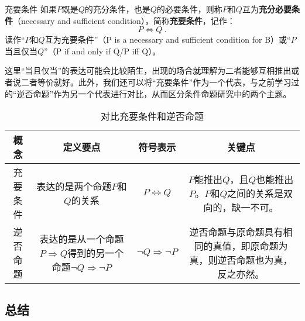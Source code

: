 \begin{definition}{充要条件}
如果$P$既是$Q$的充分条件，也是$Q$的必要条件，则称$P$和$Q$互为\textbf{充分必要条件}（necessary and sufficient condition），简称\textbf{充要条件}，记作：
\begin{equation}
P\Leftrightarrow Q~.
\end{equation}
读作“$P$和$Q$互为充要条件”（P is a necessary and sufficient condition for B）或“$P$当且仅当$Q$”（P if and only if Q/P iff Q）。
\end{definition}

这里“当且仅当”的表达可能会比较陌生，出现的场合就理解为二者能够互相推出或者说二者等价就好。此外，我们还可以将“充要条件”作为一个代表，与之前学习过的“逆否命题”作为另一个代表进行对比，从而区分条件命题研究中的两个主题。

\begin{table}[ht]
\centering
\caption{对比充要条件和逆否命题}\label{tab_HsCoPr6}
\begin{tabular}{|c|c|c|c|}
\hline
概念 & 定义要点 & 符号表示 & 关键点  \\
\hline
充要条件 & 表达的是两个命题$P$和$Q$的关系 & $P \Leftrightarrow Q$ & $P$能推出$Q$，且$Q$也能推出$P$。$P$和$Q$之间的关系是双向的，缺一不可。 \\ 
\hline
逆否命题 & 表达的是从一个命题$P \Rightarrow Q$得到的另一个命题$\neg Q \Rightarrow \neg P$ & $\neg Q \Rightarrow \neg P$ & 逆否命题与原命题具有相同的真值，即原命题为真，则逆否命题也为真，反之亦然。 \\ 
\hline
\end{tabular}
\end{table}

\subsection{总结}

